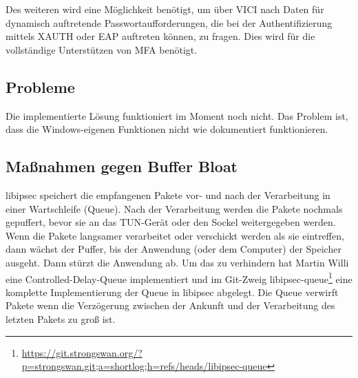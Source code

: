 Des weiteren wird eine Möglichkeit benötigt, um über \ac{VICI} nach Daten für dynamisch auftretende
Passwortaufforderungen, die bei der Authentifizierung mittels XAUTH oder EAP auftreten können,
zu fragen. Dies wird für die vollständige Unterstützen von \ac{MFA} benötigt.

\subsection{Probleme}
Die implementierte Lösung funktioniert im Moment noch nicht. Das Problem ist, dass
die Windows-eigenen Funktionen nicht wie dokumentiert funktionieren.

\subsection{Maßnahmen gegen Buffer Bloat}
libipsec speichert die empfangenen Pakete vor- und nach der Verarbeitung in einer 
Wartschleife (Queue).
Nach der Verarbeitung werden die Pakete nochmals gepuffert, bevor sie an das TUN-Gerät 
oder den Sockel
weitergegeben werden. Wenn die Pakete langsamer verarbeitet oder verschickt werden 
als sie eintreffen,
dann wächst der Puffer, bis der Anwendung (oder dem Computer) der Speicher ausgeht. 
Dann stürzt die Anwendung ab.
Um das zu verhindern hat Martin Willi eine Controlled-Delay-Queue implementiert und 
im Git-Zweig libipsec-queue\footnote{\url{https://git.strongswan.org/?p=strongswan.git;a=shortlog;h=refs/heads/libipsec-queue}} 
eine komplette Implementierung der Queue in libipsec abgelegt.
Die Queue verwirft Pakete wenn die Verzögerung zwischen der Ankunft und der Verarbeitung
des letzten Pakets zu groß ist.
